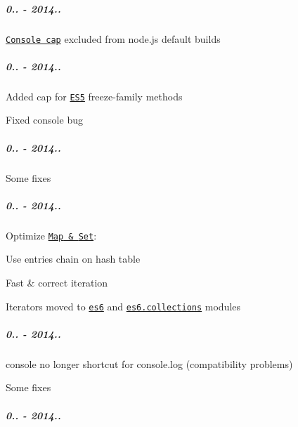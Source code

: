 \subparagraph*{0.. -\/ 2014..}


\begin{DoxyItemize}
\item \href{https://github.com/zloirock/core-js/#console}{\tt Console cap} excluded from node.\+js default builds
\end{DoxyItemize}

\subparagraph*{0.. -\/ 2014..}


\begin{DoxyItemize}
\item Added cap for \href{https://github.com/zloirock/core-js/#ecmascript-5}{\tt E\+S5} freeze-\/family methods
\item Fixed {\ttfamily console} bug
\end{DoxyItemize}

\subparagraph*{0.. -\/ 2014..}


\begin{DoxyItemize}
\item Some fixes
\end{DoxyItemize}

\subparagraph*{0.. -\/ 2014..}


\begin{DoxyItemize}
\item Optimize \href{https://github.com/zloirock/core-js/#ecmascript-6-collections}{\tt {\ttfamily Map} \& {\ttfamily Set}}\+:
\begin{DoxyItemize}
\item Use entries chain on hash table
\item Fast \& correct iteration
\item Iterators moved to \href{https://github.com/zloirock/core-js/#ecmascript-6}{\tt {\ttfamily es6}} and \href{https://github.com/zloirock/core-js/#ecmascript-6-collections}{\tt {\ttfamily es6.\+collections}} modules
\end{DoxyItemize}
\end{DoxyItemize}

\subparagraph*{0.. -\/ 2014..}


\begin{DoxyItemize}
\item {\ttfamily console} no longer shortcut for {\ttfamily console.\+log} (compatibility problems)
\item Some fixes
\end{DoxyItemize}

\subparagraph*{0.. -\/ 2014..}


